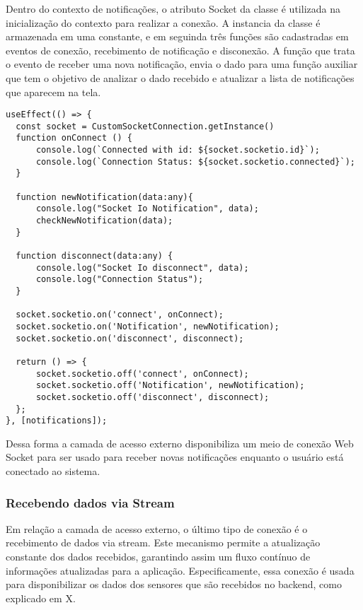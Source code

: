 Dentro do contexto de notificações, o atributo Socket da classe é utilizada na inicialização do contexto para realizar a conexão. A instancia da classe é armazenada em uma constante, e em seguinda três funções são cadastradas em eventos de conexão, recebimento de notificação e disconexão. A função que trata o evento de receber uma nova notificação, envia o dado para uma função auxiliar que tem  o objetivo de analizar o dado recebido e atualizar a lista de notificações que aparecem na tela.

\begin{verbatim}
useEffect(() => {
  const socket = CustomSocketConnection.getInstance()
  function onConnect () {
      console.log(`Connected with id: ${socket.socketio.id}`);
      console.log(`Connection Status: ${socket.socketio.connected}`);
  }

  function newNotification(data:any){
      console.log("Socket Io Notification", data);
      checkNewNotification(data);
  }

  function disconnect(data:any) {
      console.log("Socket Io disconnect", data);
      console.log("Connection Status");
  }

  socket.socketio.on('connect', onConnect);
  socket.socketio.on('Notification', newNotification);
  socket.socketio.on('disconnect', disconnect);

  return () => {
      socket.socketio.off('connect', onConnect);
      socket.socketio.off('Notification', newNotification);
      socket.socketio.off('disconnect', disconnect);
  };
}, [notifications]);
\end{verbatim}

Dessa forma a camada de acesso externo disponibiliza um meio de conexão Web Socket para ser usado para receber novas notificações enquanto o usuário está conectado ao sistema.

\subsubsection{Recebendo dados via Stream}\label{subsec:streamData}

Em relação a camada de acesso externo, o último tipo de conexão é o recebimento de dados via stream. Este mecanismo permite a atualização constante dos dados recebidos, garantindo assim um fluxo contínuo de informações atualizadas para a aplicação. Especificamente, essa conexão é usada para disponibilizar os dados dos sensores que são recebidos no backend, como explicado em X.%

